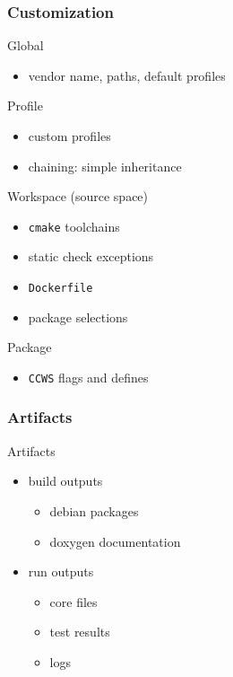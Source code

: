 \documentclass[hyperref={colorlinks=false, breaklinks=true},11pt]{beamer}
\begin{document}
\begin{frame}
    \frametitle{Customization}

    \begin{block}{Global}
        \begin{itemize}
            \item vendor name, paths, default profiles
        \end{itemize}
    \end{block}

    \begin{block}{Profile}
        \begin{itemize}
            \item custom profiles
            \item chaining: simple inheritance
        \end{itemize}
    \end{block}

    \begin{block}{Workspace (source space)}
        \begin{itemize}
            \item \texttt{cmake} toolchains
            \item static check exceptions
            \item \texttt{Dockerfile}
            \item package selections
        \end{itemize}
    \end{block}

    \begin{block}{Package}
        \begin{itemize}
            \item \texttt{CCWS} flags and defines
        \end{itemize}
    \end{block}
\end{frame}

\begin{frame}
    \frametitle{Artifacts}

    \begin{block}{Artifacts}
        \begin{itemize}
            \item build outputs
                \begin{itemize}
                    \item debian packages
                    \item doxygen documentation
                \end{itemize}
            \item run outputs
                \begin{itemize}
                    \item core files
                    \item test results
                    \item logs
                \end{itemize}
        \end{itemize}
    \end{block}
\end{frame}
\end{document}
